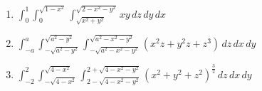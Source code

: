 \documentclass[a4paper, 12pt]{article}
\begin{document}
	\begin{enumerate}[resume]
	
		\item $\displaystyle \int_{0}^{1} \int_{0}^{\sqrt{1-x^2}} \int_{\sqrt{x^2 + y^2}}^{\sqrt{2 - x^2 - y^2}} xy \, dz \, dy \, dx$
		
		\item $\displaystyle \int_{-a}^{a} \int_{-\sqrt{a^2 - y^2}}^{\sqrt{a^2 - y^2}} \int_{-\sqrt{a^2 - x^2 - y^2}}^{\sqrt{a^2 - x^2 - y^2}} (x^{2}z + y^{2}z + z^3) \, dz \, dx \, dy$
		
		\item $\displaystyle \int_{-2}^{2} \int_{-\sqrt{4 - x^2}}^{\sqrt{4 - x^2}} \int_{2 - \sqrt{4 - x^2 - y^2}}^{2 + \sqrt{4 - x^2 - y^2}} (x^2 + y^2 + z^2)^{\frac{3}{2}} \, dz \, dx \, dy$
		
	\end{enumerate}
		
	\vspace{5mm}	
	
\end{document}
